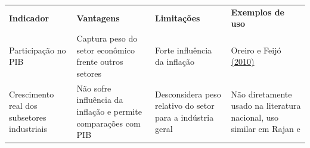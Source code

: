 \begin{longtable}[]{@{}
  >{\raggedright\arraybackslash}p{}
  >{\raggedright\arraybackslash}p{}
  >{\raggedright\arraybackslash}p{}
  >{\raggedright\arraybackslash}p{}@{}}
\toprule\noalign{}
\begin{minipage}[b]{\linewidth}\raggedright
\textbf{Indicador}
\end{minipage} & \begin{minipage}[b]{\linewidth}\raggedright
\textbf{Vantagens}
\end{minipage} & \begin{minipage}[b]{\linewidth}\raggedright
\textbf{Limitações}
\end{minipage} & \begin{minipage}[b]{\linewidth}\raggedright
\textbf{Exemplos de uso}
\end{minipage} \\
\begin{minipage}[b]{\linewidth}\raggedright
Participação no PIB
\end{minipage} & \begin{minipage}[b]{\linewidth}\raggedright
Captura peso do setor econômico frente outros setores
\end{minipage} & \begin{minipage}[b]{\linewidth}\raggedright
Forte influência da inflação
\end{minipage} & \begin{minipage}[b]{\linewidth}\raggedright
Oreiro e Feijó \href{https://www.zotero.org/google-docs/?wgWz6u}{(2010)}
\end{minipage} \\
\begin{minipage}[b]{\linewidth}\raggedright
Crescimento real dos subsetores industriais
\end{minipage} & \begin{minipage}[b]{\linewidth}\raggedright
Não sofre influência da inflação e permite comparações com PIB
\end{minipage} & \begin{minipage}[b]{\linewidth}\raggedright
Desconsidera peso relativo do setor para a indústria geral
\end{minipage} & \begin{minipage}[b]{\linewidth}\raggedright
Não diretamente usado na literatura nacional, uso similar em Rajan e

\end{minipage}
\end{longtable}
